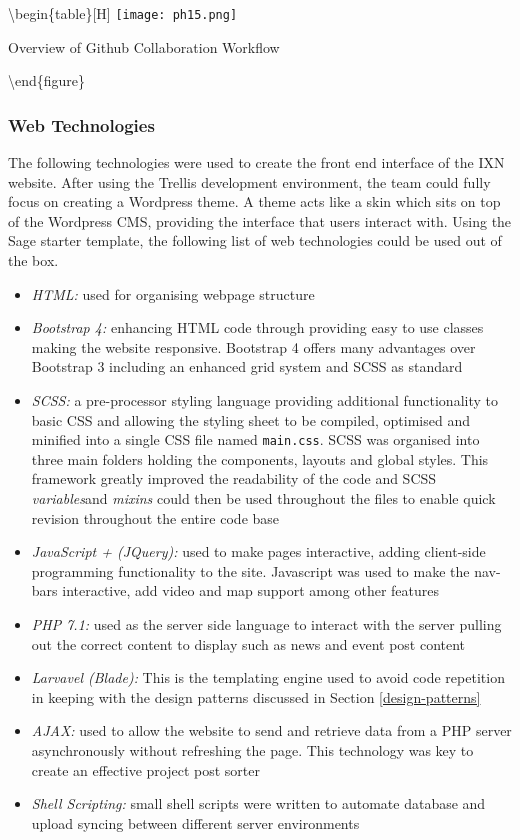 \documentclass[fontsize=11pt]{extarticle}
\numberwithin{figure}{section} %
\providecommand{\tightlist}{%
  \setlength{\itemsep}{0pt}\setlength{\parskip}{0pt}}
\begin{document}
\textbackslash{}begin\{table\}{[}H{]} \centering
\texttt{[image: ph15.png]}

\caption{Overview of Github Collaboration Workflow}
\label{githubcollab}

\textbackslash{}end\{figure\}

\hypertarget{web-technologies}{%
\subsubsection{Web Technologies}\label{web-technologies}}

The following technologies were used to create the front end interface
of the IXN website. After using the Trellis development environment, the
team could fully focus on creating a Wordpress theme. A theme acts like
a skin which sits on top of the Wordpress CMS, providing the interface
that users interact with. Using the Sage starter template, the following
list of web technologies could be used out of the box.

\begin{itemize}
\tightlist
\item
  \emph{HTML:} used for organising webpage structure
\item
  \emph{Bootstrap 4:} enhancing HTML code through providing easy to use
  classes making the website responsive. Bootstrap 4 offers many
  advantages over Bootstrap 3 including an enhanced grid system and SCSS
  as standard \cite{Differen19:online}
\item
  \emph{SCSS:} a pre-processor styling language providing additional
  functionality to basic CSS and allowing the styling sheet to be
  compiled, optimised and minified into a single CSS file named
  \texttt{main.css}. SCSS was organised into three main folders holding
  the components, layouts and global styles. This framework greatly
  improved the readability of the code and SCSS \emph{variables}and
  \emph{mixins} could then be used throughout the files to enable quick
  revision throughout the entire code base
\item
  \emph{JavaScript + (JQuery):} used to make pages interactive, adding
  client-side programming functionality to the site. Javascript was used
  to make the nav-bars interactive, add video and map support among
  other features
\item
  \emph{PHP 7.1:} used as the server side language to interact with the
  server pulling out the correct content to display such as news and
  event post content
\item
  \emph{Larvavel (Blade): } This is the templating engine used to avoid
  code repetition in keeping with the design patterns discussed in
  Section \ref{design-patterns}
\item
  \emph{AJAX:} used to allow the website to send and retrieve data from
  a PHP server asynchronously without refreshing the page. This
  technology was key to create an effective project post sorter
\item
  \emph{Shell Scripting: } small shell scripts were written to automate
  database and upload syncing between different server environments
\end{itemize}
\end{document}
